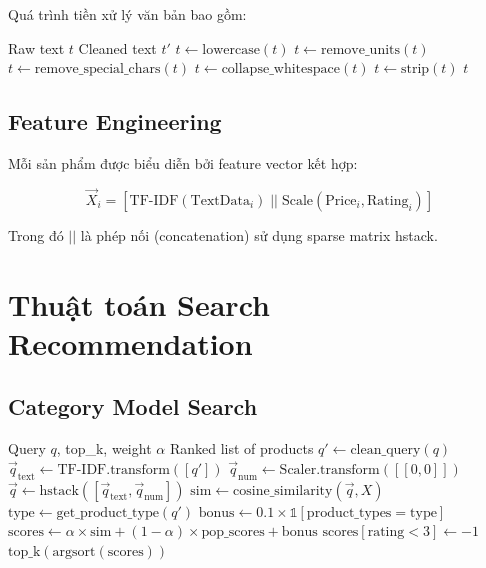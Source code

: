 \documentclass[12pt,a4paper]{report}
\begin{document}
Quá trình tiền xử lý văn bản bao gồm:

\begin{algorithm}[H]
\caption{Text Cleaning Pipeline}
\begin{algorithmic}[1]
\REQUIRE Raw text $t$
\ENSURE Cleaned text $t'$
\STATE $t \leftarrow \text{lowercase}(t)$
\STATE $t \leftarrow \text{remove\_units}(t)$ 
\STATE $t \leftarrow \text{remove\_special\_chars}(t)$ 
\STATE $t \leftarrow \text{collapse\_whitespace}(t)$ 
\STATE $t \leftarrow \text{strip}(t)$
\RETURN $t$
\end{algorithmic}
\end{algorithm}

\subsection{Feature Engineering}

Mỗi sản phẩm được biểu diễn bởi feature vector kết hợp:

\begin{equation}
\vec{X}_i = [\text{TF-IDF}(\text{TextData}_i) \; || \; \text{Scale}(\text{Price}_i, \text{Rating}_i)]
\end{equation}

Trong đó $||$ là phép nối (concatenation) sử dụng sparse matrix hstack.

\section{Thuật toán Search Recommendation}

\subsection{Category Model Search}

\begin{algorithm}[H]
\caption{Category-Specific Search Recommendation}
\begin{algorithmic}[1]
\REQUIRE Query $q$, top\_k, weight $\alpha$
\ENSURE Ranked list of products
\STATE $q' \leftarrow \text{clean\_query}(q)$
\STATE $\vec{q}_{\text{text}} \leftarrow \text{TF-IDF.transform}([q'])$
\STATE $\vec{q}_{\text{num}} \leftarrow \text{Scaler.transform}([[0, 0]])$ 
\STATE $\vec{q} \leftarrow \text{hstack}([\vec{q}_{\text{text}}, \vec{q}_{\text{num}}])$
\STATE $\text{sim} \leftarrow \text{cosine\_similarity}(\vec{q}, X)$ 
\STATE $\text{type} \leftarrow \text{get\_product\_type}(q')$
\STATE $\text{bonus} \leftarrow 0.1 \times \mathbb{1}[\text{product\_types} = \text{type}]$
\STATE $\text{scores} \leftarrow \alpha \times \text{sim} + (1-\alpha) \times \text{pop\_scores} + \text{bonus}$
\STATE $\text{scores}[\text{rating} < 3] \leftarrow -1$ 
\RETURN $\text{top\_k}(\text{argsort}(\text{scores}))$
\end{algorithmic}
\end{algorithm}
\end{document}
